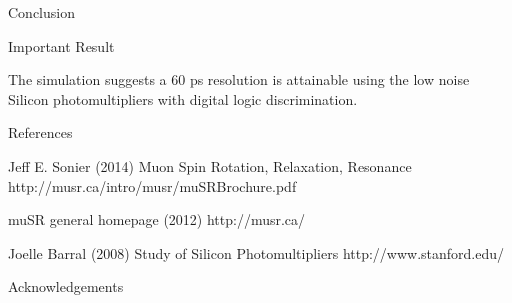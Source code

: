 \documentclass[final]{beamer}
\newlength{\onecolwid}
\begin{document}
\begin{frame}[t]
\begin{columns}[t]
\begin{column}{\onecolwid}
\begin{block}{Conclusion}
\end{block}
\begin{alertblock}{Important Result}

The simulation suggests a 60 ps resolution is attainable using the low noise Silicon photomultipliers with digital logic discrimination.

\end{alertblock}




\begin{block}{References}

\begin{thebibliography}{99} %
 Jeff E. Sonier  (2014)
\newblock  Muon Spin Rotation, Relaxation, Resonance 
\newblock http://musr.ca/intro/musr/muSRBrochure.pdf


 muSR general homepage (2012)
\newblock http://musr.ca/


 Joelle Barral  (2008)
\newblock Study of Silicon Photomultipliers
\newblock http://www.stanford.edu/



\end{thebibliography}

\end{block}



\begin{block}{Acknowledgements}

\small{} \\

\end{block}


\end{column}
\end{columns}
\end{frame}
\end{document}
